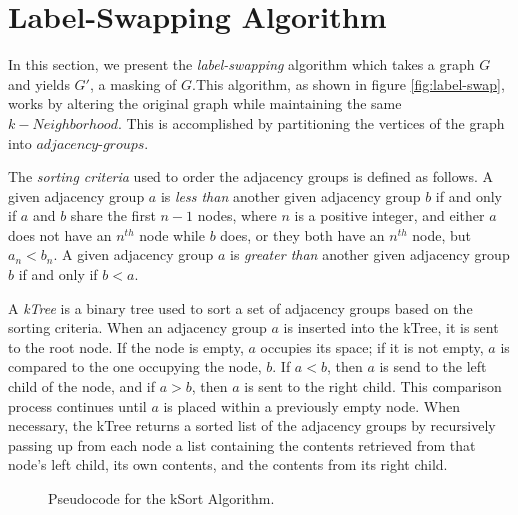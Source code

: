 \section{Label-Swapping Algorithm}
\indent In this section, we present the \emph{label-swapping} algorithm which takes a graph $G$ and yields $G'$, a masking of $G$.This algorithm, as shown in figure \ref{fig:label-swap}, works by altering the original graph while maintaining the same $k-Neighborhood$. This is accomplished by partitioning the vertices of the graph into $adjacency$-$groups$.

\begin{definition}
	The \emph{sorting criteria} used to order the adjacency groups is defined as follows. A given adjacency group $a$ is \emph{less than} another given adjacency group $b$ if and only if $a$ and $b$ share the first $n - 1$ nodes, where $n$ is a positive integer, and either $a$ does not have an $n^{th}$ node while $b$ does, or they both have an $n^{th}$ node, but $a_n < b_n$. A given adjacency group $a$ is \emph{greater than} another given adjacency group $b$ if and only if $b < a$.
\end{definition}

\begin{definition}
	A \emph{kTree} is a binary tree used to sort a set of adjacency groups based on the sorting criteria. When an adjacency group $a$ is inserted into the kTree, it is sent to the root node. If the node is empty, $a$ occupies its space; if it is not empty, $a$ is compared to the one occupying the node, $b$. If $a < b$, then $a$ is send to the left child of the node, and if $a > b$, then $a$ is sent to the right child. This comparison process continues until $a$ is placed within a previously empty node. When necessary, the kTree returns a sorted list of the adjacency groups by recursively passing up from each node a list containing the contents retrieved from that node's left child, its own contents, and the contents from its right child.
\end{definition}

\begin{figure}[htb]
	\begin{algorithmic}
		\renewcommand{\algorithmicrequire}{\textbf{Input:}}
		\renewcommand{\algorithmicensure}{\textbf{Output:}}
		\EndFor
		\State {}
	\end{algorithmic}
	\caption{Pseudocode for the kSort Algorithm.}
	\label{fig:kSort}
\end{figure}

